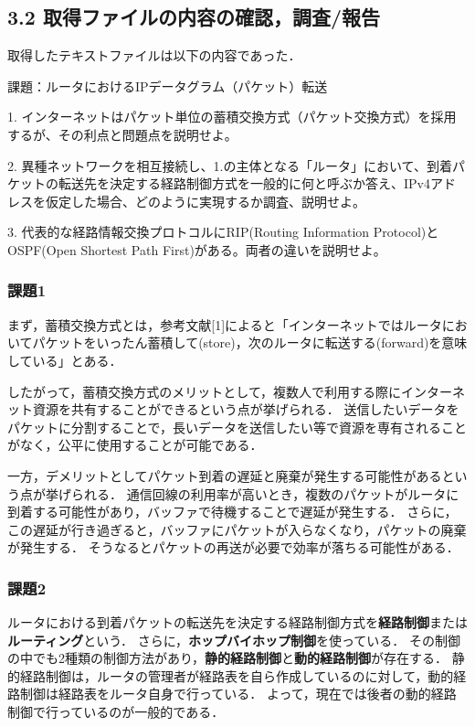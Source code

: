 \documentclass[documentclass]{jsarticle}
\begin{document}
\subsection*{3.2 取得ファイルの内容の確認，調査/報告}
取得したテキストファイルは以下の内容であった．
\begin{tcolorbox}
  課題：ルータにおけるIPデータグラム（パケット）転送

  1. インターネットはパケット単位の蓄積交換方式（パケット交換方式）を採用するが、その利点と問題点を説明せよ。
  
  2. 異種ネットワークを相互接続し、1.の主体となる「ルータ」において、到着パケットの転送先を決定する経路制御方式を一般的に何と呼ぶか答え、IPv4アドレスを仮定した場合、どのように実現するか調査、説明せよ。
  
  3. 代表的な経路情報交換プロトコルにRIP(Routing Information Protocol)とOSPF(Open Shortest Path First)がある。両者の違いを説明せよ。
\end{tcolorbox}

\subsubsection*{課題1}
まず，蓄積交換方式とは，参考文献[1]によると「インターネットではルータにおいてパケットをいったん蓄積して(store)，次のルータに転送する(forward)を意味している」とある．

したがって，蓄積交換方式のメリットとして，複数人で利用する際にインターネット資源を共有することができるという点が挙げられる．
送信したいデータをパケットに分割することで，長いデータを送信したい等で資源を専有されることがなく，公平に使用することが可能である．

一方，デメリットとしてパケット到着の遅延と廃棄が発生する可能性があるという点が挙げられる．
通信回線の利用率が高いとき，複数のパケットがルータに到着する可能性があり，バッファで待機することで遅延が発生する．
さらに，この遅延が行き過ぎると，バッファにパケットが入らなくなり，パケットの廃棄が発生する．
そうなるとパケットの再送が必要で効率が落ちる可能性がある．

\subsubsection*{課題2}
ルータにおける到着パケットの転送先を決定する経路制御方式を\textbf{経路制御}または\textbf{ルーティング}という．
さらに，\textbf{ホップバイホップ制御}を使っている．
その制御の中でも2種類の制御方法があり，\textbf{静的経路制御}と\textbf{動的経路制御}が存在する．
静的経路制御は，ルータの管理者が経路表を自ら作成しているのに対して，動的経路制御は経路表をルータ自身で行っている．
よって，現在では後者の動的経路制御で行っているのが一般的である．
\end{document}
